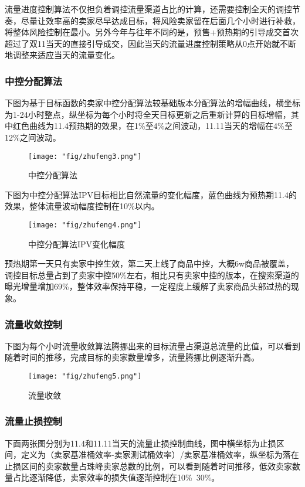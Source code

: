 流量进度控制算法不仅担负着调控流量渠道占比的计算，还需要控制全天的调控节奏，尽量让效率高的卖家尽早达成目标，将风险卖家留在后面几个小时进行补救，将整体风险控制在最小。另外今年与往年不同的是，预售+预热期的引导成交首次超过了双11当天的直接引导成交，因此当天的流量进度控制策略从0点开始就不断地调整来适应当天的流量变化。

\subsubsection{中控分配算法}
下图为基于目标函数的卖家中控分配算法较基础版本分配算法的增幅曲线，横坐标为1-24小时整点，纵坐标为每个小时将全天目标更新之后重新计算的目标增幅，其中红色曲线为11.4预热期的效果，在1\%至4\%之间波动，11.11当天的增幅在4\%至12\%之间波动。

\begin{figure}[!h]
	\centering
	\texttt{[image: "fig/zhufeng3.png"]}
	\caption{中控分配算法}
	\label{fig:zhufeng3}
\end{figure}

下图为中控分配算法IPV目标相比自然流量的变化幅度，蓝色曲线为预热期11.4的效果，整体流量波动幅度控制在10\%以内。

\begin{figure}[!h]
	\centering
	\texttt{[image: "fig/zhufeng4.png"]}
	\caption{中控分配算法IPV变化幅度}
	\label{fig:zhufeng4}
\end{figure}

预热期第一天只有卖家中控生效，第二天上线了商品中控，大概6w商品被覆盖，调控目标总量占到了卖家中控50\%左右，相比只有卖家中控的版本，在搜索渠道的曝光增量增加69\%，整体效率保持平稳，一定程度上缓解了卖家商品头部过热的现象。

\subsubsection{流量收敛控制}
下图为每个小时流量收敛算法腾挪出来的目标流量占渠道总流量的比值，可以看到随着时间的推移，完成目标的卖家数量增多，流量腾挪比例逐渐升高。

\begin{figure}[!h]
	\centering
	\texttt{[image: "fig/zhufeng5.png"]}
	\caption{流量收敛}
	\label{fig:zhufeng5}
\end{figure}

\subsubsection{流量止损控制}
下面两张图分别为11.4和11.11当天的流量止损控制曲线，图中横坐标为止损区间，定义为（卖家基准桶效率-卖家测试桶效率）/卖家基准桶效率，纵坐标为落在止损区间的卖家数量占珠峰卖家总数的比例，可以看到随着时间推移，低效卖家数量占比逐渐降低，卖家效率的损失值逐渐控制在10\%~30\%。

